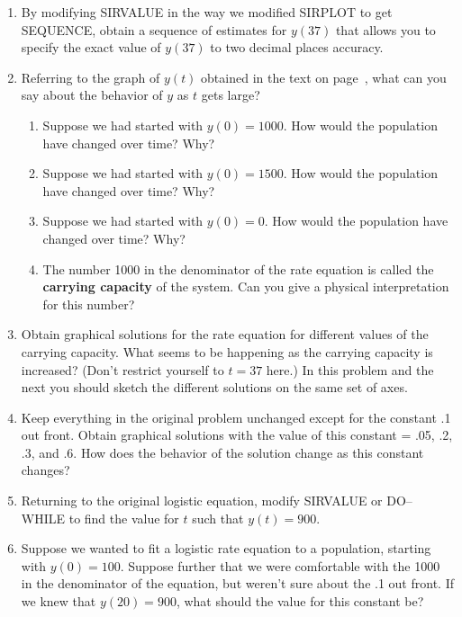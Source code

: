 \begin{enumerate}
\item By modifying SIRVALUE in the way we modified SIRPLOT to get
 SEQUENCE, obtain a sequence of estimates for $y(37)$ that allows you
 to specify the exact value of $y(37)$ to two decimal places accuracy.


\item Referring to the graph of $y(t)$ obtained in the text on
 page~\pageref{`sequence'}, what can you say about the behavior of $y$
 as $t$ gets large?

  \begin{enumerate}
  \item Suppose we had started with $y(0)=1000$.  How would the
 population have changed over time? Why?

  \item Suppose we had started with $y(0)=1500$.  How would the
 population have changed over time? Why?

  \item Suppose we had started with $y(0)=0$.  How would the population
 have changed over time? Why?

  \item The number 1000 in the denominator of the rate equation is called
 the {\bf carrying capacity} of the system.
  Can you give a physical interpretation for this number?


\end{enumerate}
\item Obtain graphical solutions for the rate equation for different
 values of the carrying capacity.  What seems to be happening as the
 carrying capacity is increased?  (Don't restrict yourself to $t = 37$
 here.)  In this problem and the next you should sketch the different
 solutions on the same set of axes.


\item Keep everything in the original problem unchanged except for the
 constant .1 out front.  Obtain graphical solutions with the value of
 this constant = .05, .2, .3, and .6.  How does the behavior of the
 solution change as this constant changes?


\item Returning to the original logistic equation, modify SIRVALUE or
 DO--WHILE to find the value for $t$ such that $y(t)=900$.


\item Suppose we wanted to fit a logistic rate equation to a
 population, starting with $y(0)=100$.  Suppose further that we were
 comfortable with the 1000 in the denominator of the equation, but
 weren't sure about the .1 out front. If we knew that $y(20)=900$,
 what should the value for this constant be?
\label{logistic-end} 

\end{enumerate}
